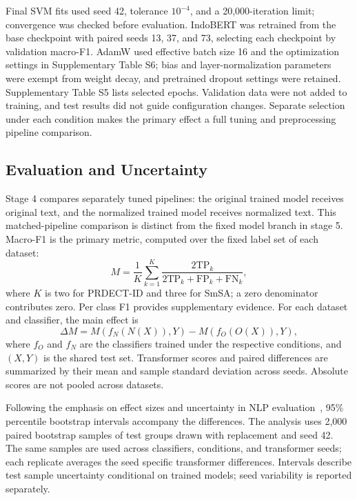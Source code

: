 Final SVM fits used seed 42, tolerance $10^{-4}$, and a 20,000-iteration limit; convergence was checked before evaluation. IndoBERT was retrained from the base checkpoint with paired seeds 13, 37, and 73, selecting each checkpoint by validation macro-F1. AdamW used effective batch size 16 and the optimization settings in Supplementary Table S6; bias and layer-normalization parameters were exempt from weight decay, and pretrained dropout settings were retained. Supplementary Table S5 lists selected epochs. Validation data were not added to training, and test results did not guide configuration changes. Separate selection under each condition makes the primary effect a full tuning and preprocessing pipeline comparison.

\subsection{Evaluation and Uncertainty}
Stage 4 compares separately tuned pipelines: the original trained model receives original text, and the normalized trained model receives normalized text. This matched-pipeline comparison is distinct from the fixed model branch in stage 5. Macro-F1 is the primary metric, computed over the fixed label set of each dataset:
\begin{equation}
M=\frac{1}{K}\sum_{k=1}^{K}
\frac{2\mathrm{TP}_k}{2\mathrm{TP}_k+\mathrm{FP}_k+\mathrm{FN}_k},
\end{equation}
where $K$ is two for PRDECT-ID and three for SmSA; a zero denominator contributes zero. Per class F1 provides supplementary evidence. For each dataset and classifier, the main effect is
\begin{equation}
\Delta M=M(f_N(N(X)),Y)-M(f_O(O(X)),Y),
\end{equation}
where $f_O$ and $f_N$ are the classifiers trained under the respective conditions, and $(X,Y)$ is the shared test set. Transformer scores and paired differences are summarized by their mean and sample standard deviation across seeds. Absolute scores are not pooled across datasets.

Following the emphasis on effect sizes and uncertainty in NLP evaluation~\cite{bestgen2022}, 95\% percentile bootstrap intervals accompany the differences. The analysis uses 2,000 paired bootstrap samples of test groups drawn with replacement and seed 42. The same samples are used across classifiers, conditions, and transformer seeds; each replicate averages the seed specific transformer differences. Intervals describe test sample uncertainty conditional on trained models; seed variability is reported separately.

